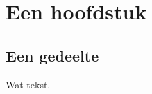 \documentclass{report}
\begin{document}
\tableofcontents
\chapter{Een hoofdstuk}
\section{Een gedeelte}
Wat tekst.
\end{document}
